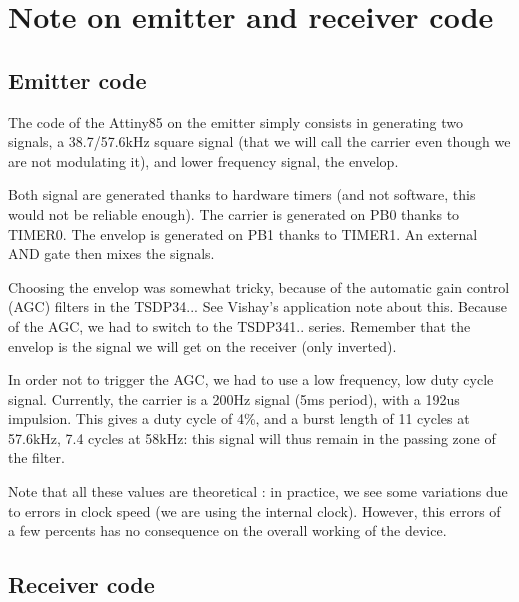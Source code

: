 \documentclass[a4paper,11pt]{article}
\begin{document}
\section{Note on emitter and receiver code}

\subsection{Emitter code}
\indent \par The code of the Attiny85 on the emitter simply consists in generating two signals, a 38.7/57.6kHz square signal (that we will call the carrier even though we are not modulating it), and lower frequency signal, the envelop.
\par Both signal are generated thanks to hardware timers (and not software, this would not be reliable enough). The carrier is generated on PB0 thanks to TIMER0. The envelop is generated on PB1 thanks to TIMER1. An external AND gate then mixes the signals.
\par Choosing the envelop was somewhat tricky, because of the automatic gain control (AGC) filters in the TSDP34... See Vishay's application note about this. Because of the AGC, we had to switch to the TSDP341.. series. Remember that the envelop is the signal we will get on the receiver (only inverted).
\par In order not to trigger the AGC, we had to use a low frequency, low duty cycle signal. Currently, the carrier is a 200Hz signal (5ms period), with a 192us impulsion. This gives a duty cycle of 4\%, and a burst length of 11 cycles at 57.6kHz, 7.4 cycles at 58kHz: this signal will thus remain in the passing zone of the filter.
\par Note that all these values are theoretical : in practice, we see some variations due to errors in clock speed (we are using the internal clock). However, this errors of a few percents has no consequence on the overall working of the device.

\subsection{Receiver code}
\end{document}
